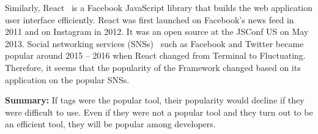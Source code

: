 \documentclass[english,preprint,JIP,technote]{ipsj}
\begin{document}
Similarly, React~\cite{staff2016react} is a Facebook JavaScript library that builds the web application user interface efficiently. React was first launched on Facebook’s news feed in 2011 and on Instagram in 2012. It was an open source at the JSConf US on May 2013. Social networking services (SNSs)~\cite{ellison2013sociality} such as Facebook and Twitter became popular around 2015 – 2016 when React changed from Terminal to Fluctuating. Therefore, it seems that the popularity of the Framework changed based on its application on the popular SNSs.


\noindent \textbf{Summary:}
If tags were the popular tool, their popularity would decline if they were difficult to use. Even if they were not a popular tool and they turn out to be an efficient tool, they will be popular among developers.


\end{document}
